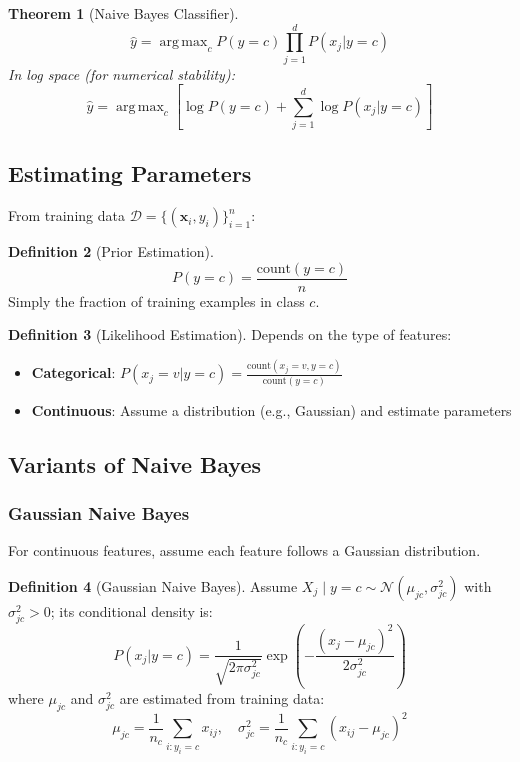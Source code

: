 \documentclass[11pt,twoside]{article}
\numberwithin{equation}{section}
\DeclareMathOperator*{\argmax}{arg\,max}
\newcommand{\vect}[1]{\bm{#1}}
\theoremstyle{plain}
\newtheorem{theorem}{Theorem}[section]
\theoremstyle{definition}
\newtheorem{definition}[theorem]{Definition}
\theoremstyle{remark}
\begin{document}
\begin{theorem}[Naive Bayes Classifier]
\[
\hat{y} = \argmax_{c} P(y=c) \prod_{j=1}^d P(x_j | y=c)
\]
In log space (for numerical stability):
\[
\hat{y} = \argmax_{c} \left[\log P(y=c) + \sum_{j=1}^d \log P(x_j | y=c)\right]
\]
\end{theorem}

\subsection{Estimating Parameters}

From training data $\mathcal{D} = \{(\vect{x}_i, y_i)\}_{i=1}^n$:

\begin{definition}[Prior Estimation]
\[
P(y = c) = \frac{\text{count}(y=c)}{n}
\]
Simply the fraction of training examples in class $c$.
\end{definition}

\begin{definition}[Likelihood Estimation]
Depends on the type of features:
\begin{itemize}
\item \textbf{Categorical}: $P(x_j = v | y=c) = \frac{\text{count}(x_j=v, y=c)}{\text{count}(y=c)}$
\item \textbf{Continuous}: Assume a distribution (e.g., Gaussian) and estimate parameters
\end{itemize}
\end{definition}

\subsection{Variants of Naive Bayes}

\subsubsection{Gaussian Naive Bayes}

For continuous features, assume each feature follows a Gaussian distribution.

\begin{definition}[Gaussian Naive Bayes]
Assume $X_j\mid y=c\sim\mathcal{N}(\mu_{jc},\sigma_{jc}^2)$ with $\sigma_{jc}^2>0$; its conditional density is:
\[
P(x_j | y=c) = \frac{1}{\sqrt{2\pi\sigma_{jc}^2}} \exp\left(-\frac{(x_j - \mu_{jc})^2}{2\sigma_{jc}^2}\right)
\]
where $\mu_{jc}$ and $\sigma_{jc}^2$ are estimated from training data:
\[
\mu_{jc} = \frac{1}{n_c}\sum_{i: y_i=c} x_{ij}, \quad \sigma_{jc}^2 = \frac{1}{n_c}\sum_{i: y_i=c} (x_{ij} - \mu_{jc})^2
\]
\end{definition}
\end{document}
